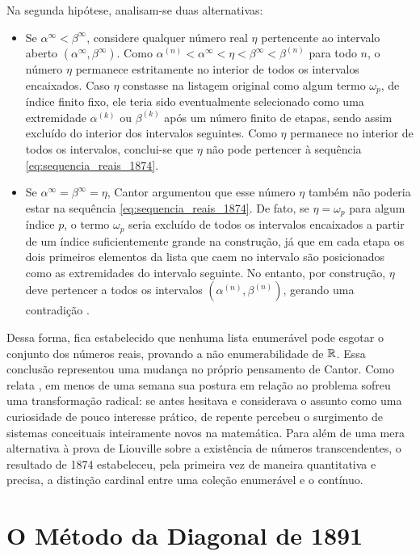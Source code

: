 Na segunda hipótese, analisam-se duas alternativas:
\begin{itemize}
    \item Se \(\alpha^\infty < \beta^\infty\), considere qualquer número real \(\eta\) pertencente ao intervalo aberto \((\alpha^\infty, \beta^\infty)\). Como \(\alpha^{(n)} < \alpha^\infty < \eta < \beta^\infty < \beta^{(n)}\) para todo \(n\), o número \(\eta\) permanece estritamente no interior de todos os intervalos encaixados. Caso \(\eta\) constasse na listagem original como algum termo \(\omega_p\), de índice finito fixo, ele teria sido eventualmente selecionado como uma extremidade \(\alpha^{(k)}\) ou \(\beta^{(k)}\) após um número finito de etapas, sendo assim excluído do interior dos intervalos seguintes. Como \(\eta\) permanece no interior de todos os intervalos, conclui-se que \(\eta\) não pode pertencer à sequência \eqref{eq:sequencia_reais_1874}.
    \item Se \(\alpha^\infty = \beta^\infty = \eta\), Cantor argumentou que esse número \(\eta\) também não poderia estar na sequência \eqref{eq:sequencia_reais_1874}. De fato, se \(\eta = \omega_p\) para algum índice \(p\), o termo \(\omega_p\) seria excluído de todos os intervalos encaixados a partir de um índice suficientemente grande na construção, já que em cada etapa os dois primeiros elementos da lista que caem no intervalo são posicionados como as extremidades do intervalo seguinte. No entanto, por construção, \(\eta\) deve pertencer a todos os intervalos \((\alpha^{(n)}, \beta^{(n)})\), gerando uma contradição \parencite[p.~51]{dauben1990}.
\end{itemize}

Dessa forma, fica estabelecido que nenhuma lista enumerável pode esgotar o conjunto dos números reais, provando a não enumerabilidade de \(\mathbb{R}\). Essa conclusão representou uma mudança no próprio pensamento de Cantor. Como relata \textcite[p.~53]{dauben1990}, em menos de uma semana sua postura em relação ao problema sofreu uma transformação radical: se antes hesitava e considerava o assunto como uma curiosidade de pouco interesse prático, de repente percebeu o surgimento de sistemas conceituais inteiramente novos na matemática. Para além de uma mera alternativa à prova de Liouville sobre a existência de números transcendentes, o resultado de 1874 estabeleceu, pela primeira vez de maneira quantitativa e precisa, a distinção cardinal entre uma coleção enumerável e o contínuo.

\section{O Método da Diagonal de 1891}
\label{sec:metodo_diagonal_1891}

